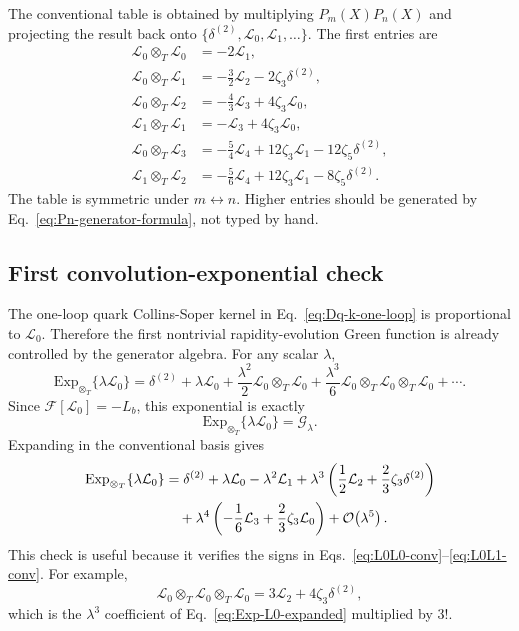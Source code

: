 \documentclass[11pt]{article}
\newcommand{\deltaT}{\delta^{(2)}}
\newcommand{\ot}{\otimes_T}
\newcommand{\order}[1]{\mathcal{O}\!\left(#1\right)}
\newcommand{\ExpT}{\mathrm{Exp}_{\otimes_T}}
\begin{document}
The conventional table is obtained by multiplying $P_m(X)P_n(X)$ and projecting the result
back onto $\{\deltaT,\mathcal L_0,\mathcal L_1,\ldots\}$. The first entries are
\begin{align}
  \mathcal L_0\ot\mathcal L_0
  &=-2\mathcal L_1,
  \label{eq:L0L0-conv}
  \\
  \mathcal L_0\ot\mathcal L_1
  &=-\frac{3}{2}\mathcal L_2-2\zeta_3\deltaT,
  \label{eq:L0L1-conv}
  \\
  \mathcal L_0\ot\mathcal L_2
  &=-\frac{4}{3}\mathcal L_3+4\zeta_3\mathcal L_0,
  \label{eq:L0L2-conv}
  \\
  \mathcal L_1\ot\mathcal L_1
  &=-\mathcal L_3+4\zeta_3\mathcal L_0,
  \label{eq:L1L1-conv}
  \\
  \mathcal L_0\ot\mathcal L_3
  &=-\frac{5}{4}\mathcal L_4+12\zeta_3\mathcal L_1-12\zeta_5\deltaT,
  \label{eq:L0L3-conv}
  \\
  \mathcal L_1\ot\mathcal L_2
  &=-\frac{5}{6}\mathcal L_4+12\zeta_3\mathcal L_1-8\zeta_5\deltaT.
  \label{eq:L1L2-conv}
\end{align}
The table is symmetric under $m\leftrightarrow n$. Higher entries should be generated by
Eq.~\eqref{eq:Pn-generator-formula}, not typed by hand.

\subsection{First convolution-exponential check}

The one-loop quark Collins-Soper kernel in Eq.~\eqref{eq:Dq-k-one-loop} is proportional
to $\mathcal L_0$. Therefore the first nontrivial rapidity-evolution Green function is
already controlled by the generator algebra. For any scalar $\lambda$,
\begin{equation}
  \ExpT\{\lambda\mathcal L_0\}
  =\deltaT+\lambda\mathcal L_0
  +\frac{\lambda^2}{2}\mathcal L_0\ot\mathcal L_0
  +\frac{\lambda^3}{6}\mathcal L_0\ot\mathcal L_0\ot\mathcal L_0+\cdots.
  \label{eq:Exp-L0-start}
\end{equation}
Since $\mathcal F[\mathcal L_0]=-L_b$, this exponential is exactly
\begin{equation}
  \boxed{\ExpT\{\lambda\mathcal L_0\}=\mathcal G_\lambda.}
  \label{eq:Exp-L0-G}
\end{equation}
Expanding in the conventional basis gives
\begin{align}
  \ExpT\{\lambda\mathcal L_0\}
  &=\deltaT+\lambda\mathcal L_0-\lambda^2\mathcal L_1
  +\lambda^3\left(\frac{1}{2}\mathcal L_2+\frac{2}{3}\zeta_3\deltaT\right)
  \notag\\
  &\quad
  +\lambda^4\left(-\frac{1}{6}\mathcal L_3+\frac{2}{3}\zeta_3\mathcal L_0\right)
  +\order{\lambda^5}.
  \label{eq:Exp-L0-expanded}
\end{align}
This check is useful because it verifies the signs in
Eqs.~\eqref{eq:L0L0-conv}--\eqref{eq:L0L1-conv}. For example,
\begin{equation}
  \mathcal L_0\ot\mathcal L_0\ot\mathcal L_0
  =3\mathcal L_2+4\zeta_3\deltaT,
  \label{eq:L0-cubed}
\end{equation}
which is the $\lambda^3$ coefficient of Eq.~\eqref{eq:Exp-L0-expanded} multiplied by
$3!$.
\end{document}
